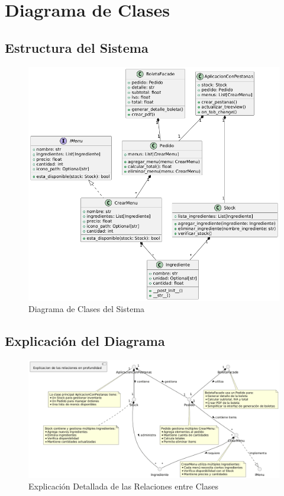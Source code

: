\documentclass[12pt,letterpaper]{article}
\begin{document}
\section{Diagrama de Clases}
\subsection{Estructura del Sistema}
\begin{figure}[H]
    \centering
    \includegraphics[width=\textwidth]{./images/diagrama.png}
    \caption{Diagrama de Clases del Sistema}
    \label{fig:diagrama}
\end{figure}

\subsection{Explicación del Diagrama}
\begin{figure}[H]
    \centering
    \includegraphics[width=\textwidth]{./images/explicacion_diagrama.png}
    \caption{Explicación Detallada de las Relaciones entre Clases}
    \label{fig:explicacion-diagrama}
\end{figure}
\end{document}
